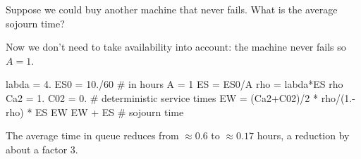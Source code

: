 \begin{exercise}[\faPhoto]
  Suppose we could buy another machine that never fails. What is the average sojourn time?
  \begin{solution}
Now we don't need to take availability into account: the machine never fails so $A=1$. 
    \begin{pyconsole}
labda = 4.
ES0 = 10./60 # in hours
A = 1
ES = ES0/A
rho = labda*ES
rho
Ca2 = 1.
C02 = 0. # deterministic service times
EW = (Ca2+C02)/2 * rho/(1.-rho) * ES
EW
EW + ES # sojourn time
\end{pyconsole}
The average time in queue reduces from $\approx 0.6$ to $\approx 0.17$ hours, a reduction by about a factor 3. 
\end{solution}
\end{exercise}







